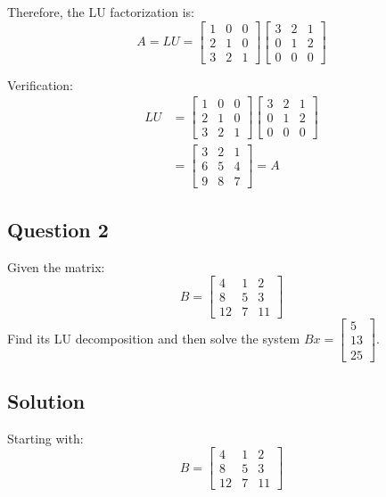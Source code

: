 \documentclass[12pt]{article}
\begin{document}
Therefore, the LU factorization is:
\[
	{A = LU = \begin{bmatrix}
		1 & 0 & 0 \\
		2 & 1 & 0 \\
		3 & 2 & 1
	\end{bmatrix} \begin{bmatrix}
		3 & 2 & 1 \\
		0 & 1 & 2 \\
		0 & 0 & 0
	\end{bmatrix}}
\]

Verification:
\begin{align*}
	LU &= \begin{bmatrix}
		1 & 0 & 0 \\
		2 & 1 & 0 \\
		3 & 2 & 1
	\end{bmatrix} \begin{bmatrix}
		3 & 2 & 1 \\
		0 & 1 & 2 \\
		0 & 0 & 0
	\end{bmatrix} \\
	&= \begin{bmatrix}
		3 & 2 & 1 \\
		6 & 5 & 4 \\
		9 & 8 & 7
	\end{bmatrix} = A
\end{align*}

\subsection*{Question 2}
Given the matrix:
$$
B = \begin{bmatrix}
4 & 1 & 2 \\
8 & 5 & 3 \\
12 & 7 & 11
\end{bmatrix}
$$
Find its LU decomposition and then solve the system $Bx = \begin{bmatrix} 5 \\ 13 \\ 25 \end{bmatrix}$.

\subsection*{Solution}

Starting with:
\[
	B = \begin{bmatrix}
		4 & 1 & 2 \\
		8 & 5 & 3 \\
		12 & 7 & 11
	\end{bmatrix}
\]
\end{document}
